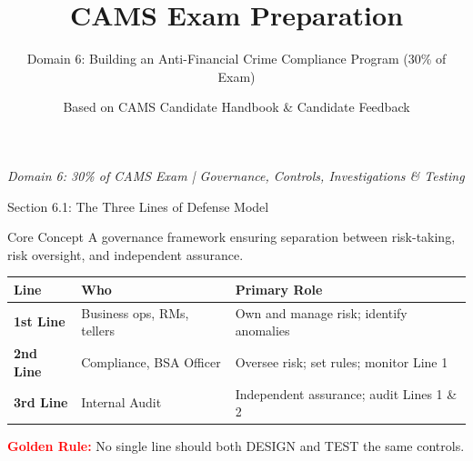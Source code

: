 \documentclass[11pt,a4paper]{beamer}
\title{CAMS Exam Preparation}
\subtitle{Domain 6: Building an Anti-Financial Crime Compliance Program (30\% of Exam)}
\author{Based on CAMS Candidate Handbook \& Candidate Feedback}
\date{}
\newcommand{\redflag}[1]{\textcolor{red}{\textbf{#1}}}
\begin{document}
	
	\begin{frame}
		\titlepage
		\centering
		\textit{Domain 6: 30\% of CAMS Exam | Governance, Controls, Investigations \& Testing}
	\end{frame}
	
	
	\begin{frame}{Section 6.1: The Three Lines of Defense Model}
		\begin{block}{Core Concept}
			A governance framework ensuring separation between risk-taking, risk oversight, and independent assurance.
		\end{block}
		\begin{tabular}{p{}|p{}|p{0.35\textwidth}}
			\hline
			\rowcolor{lightgray}
			\textbf{Line} & \textbf{Who} & \textbf{Primary Role} \\
			\hline
			\textbf{1st Line} & Business ops, RMs, tellers & Own and manage risk; identify anomalies \\
			\hline
			\textbf{2nd Line} & Compliance, BSA Officer & Oversee risk; set rules; monitor Line 1 \\
			\hline
			\textbf{3rd Line} & Internal Audit & Independent assurance; audit Lines 1 \& 2 \\
			\hline
		\end{tabular}
		\vspace{0.3cm}
		\redflag{Golden Rule:} No single line should both DESIGN and TEST the same controls.
	\end{frame}
	
\end{document}
